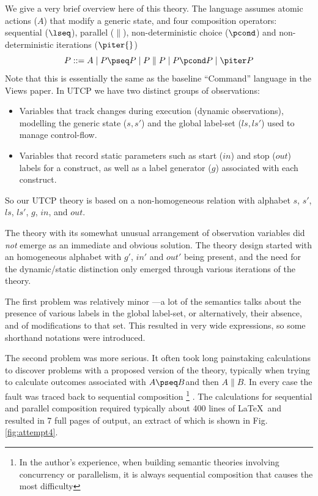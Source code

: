 We give a very brief overview here of this theory.
The language assumes atomic actions ($A$) that modify a generic state,
and four composition operators: sequential ($\lseq$), parallel ($\parallel$),
non-deterministic choice ($\pcond$) and non-deterministic iterations ($\piter{}$)
\[
   P ::= A \mid P \pseq P \mid P \parallel P \mid P \pcond P \mid \piter P
\]
Note that this is essentially the same as the baseline ``Command'' language
in the Views paper\cite{conf/popl/Dinsdale-YoungBGPY13}.
In UTCP we have two distinct groups of observations:
\begin{itemize}
  \item
    Variables that track changes during execution
    (dynamic observations),
    modelling the generic state ($s,s'$)
    and the global label-set ($ls,ls'$) used to manage control-flow.
  \item
    Variables that record static parameters such as start ($in$)
    and stop ($out$) labels for a construct,
    as well as a label generator ($g$) associated with each construct.
\end{itemize}
So our UTCP theory is based on a non-homogeneous relation
with alphabet $s$, $s'$, $ls$, $ls'$, $g$, $in$, and $out$.


The theory with its somewhat unusual arrangement of observation variables
did \emph{not} emerge as an immediate and obvious solution.
The theory design started with an homogeneous alphabet with $g'$, $in'$ and $out'$
being present, and the need for the dynamic/static distinction only emerged
through various iterations of the theory.

The first problem was relatively minor
---a lot of the semantics talks about the presence of various
labels in the global label-set, or alternatively, their  absence,
and of modifications to that set.
This resulted in very wide expressions,
so some shorthand notations were introduced.

The second problem was more serious.
It often took long painstaking calculations to discover problems
with a proposed version of the theory,
typically when trying to calculate outcomes associated with
$A \pseq B$and then  $A \parallel B$.
In every case the fault was traced back to sequential composition%
\footnote{
In the author's experience,
when building semantic theories involving concurrency or parallelism,
it is always sequential composition that causes the most difficulty
}
.
The calculations for sequential and parallel composition
required typically about 400 lines of \LaTeX\ and resulted
in 7 full pages of output,
an extract of which is shown in Fig. \ref{fig:attempt4}.

